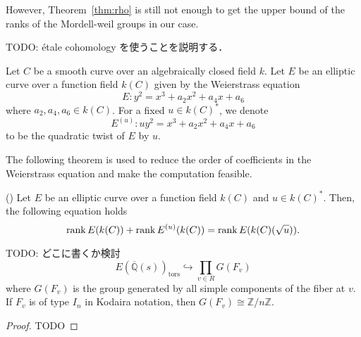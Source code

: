 \documentclass[main]{subfiles}
\begin{document}
However, Theorem~\ref{thm:rho} is still not enough to get the upper bound of the ranks of the Mordell-weil groups in our case.

TODO: \'etale cohomology を使うことを説明する．


\begin{dfn}
    Let $C$ be a smooth curve over an algebraically closed field $k$.
    Let $E$ be an elliptic curve over a function field $k(C)$ given by the Weierstrass equation
    \begin{equation}
        E: y^{2} = x^{3} + a_{2} x^{2} + a_{4} x + a_{6}
    \end{equation}
    where $a_{2}, a_{4}, a_{6} \in k(C)$.
    For a fixed $u \in k(C)^*$, we denote
    \begin{equation}
        E^{(u)}: u y^{2} = x^{3} + a_{2} x^{2} + a_{4} x + a_{6}
    \end{equation}
    to be the quadratic twist of $E$ by $u$.
\end{dfn}

The following theorem is used to reduce the order of coefficients in the Weierstrass equation and make the computation feasible.

\begin{thm}{(\cite[Exercise 10.16]{ref:aec})}
    Let $E$ be an elliptic curve over a function field $k(C)$ and $u \in k(C)^*$.
    Then, the following equation holds
    \begin{equation}
        \operatorname{rank} E(k(C)) + \operatorname{rank} E^{(u)}(k(C)) = \operatorname{rank} E(k(C)(\sqrt{u})).
    \end{equation}
\end{thm}

\begin{thm}{\cite[Lem.3.5]{ref:naskrecki2013} TODO: どこに書くか検討}
    \label{thm:torsion}
    \begin{equation}
        E(\overline{\mathbb{Q}}(s))_{\text{tors}} \hookrightarrow \prod_{v \in R} G(F_{v})
    \end{equation}
    where $G(F_{v})$ is the group generated by all simple components of the fiber at $v$.
    If $F_v$ is of type $I_n$ in Kodaira notation, then $G(F_{v}) \cong \mathbb{Z} / n \mathbb{Z}$.
\end{thm}
\begin{proof}
    TODO
\end{proof}
\end{document}
